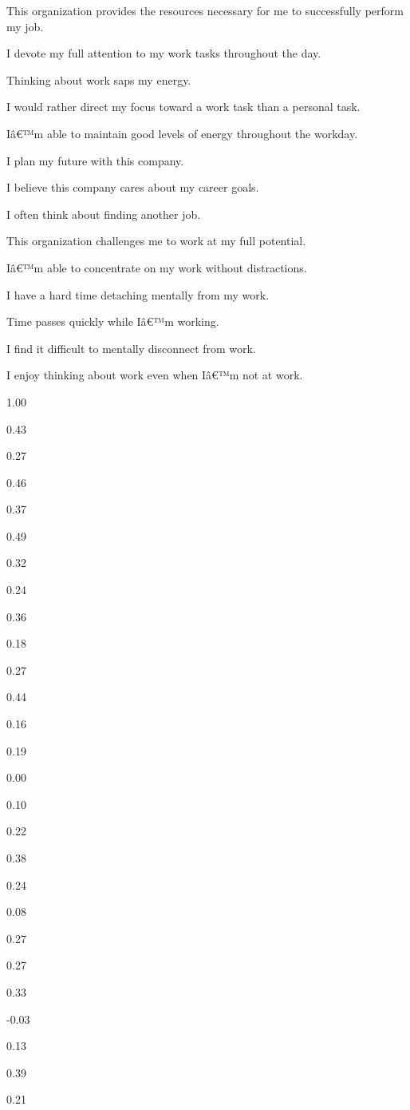 \documentclass[
]{book}
\begin{document}
This organization provides the resources necessary for me to successfully perform my job.

I devote my full attention to my work tasks throughout the day.

Thinking about work saps my energy.

I would rather direct my focus toward a work task than a personal task.

Iâ€™m able to maintain good levels of energy throughout the workday.

I plan my future with this company.

I believe this company cares about my career goals.

I often think about finding another job.

This organization challenges me to work at my full potential.

Iâ€™m able to concentrate on my work without distractions.

I have a hard time detaching mentally from my work.

Time passes quickly while Iâ€™m working.

I find it difficult to mentally disconnect from work.

I enjoy thinking about work even when Iâ€™m not at work.

1.00

0.43

0.27

0.46

0.37

0.49

0.32

0.24

0.36

0.18

0.27

0.44

0.16

0.19

0.00

0.10

0.22

0.38

0.24

0.08

0.27

0.27

0.33

-0.03

0.13

0.39

0.21
\end{document}
